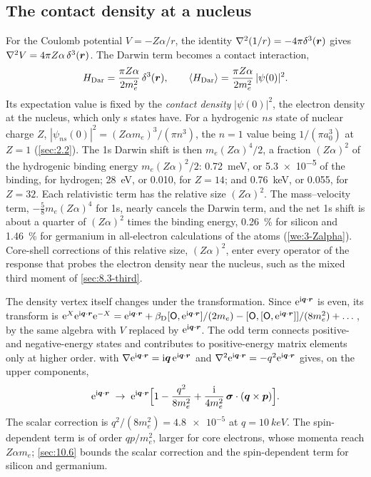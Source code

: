 \subsection{The contact density at a nucleus}

For the Coulomb potential $V = -Z\alpha/r$, the identity $\nabla^2(1/r) = -4\pi\delta^3(\bm{r})$ gives $\nabla^2V = 4\pi Z\alpha\,\delta^3(\bm{r})$. The Darwin term becomes a contact interaction,
\begin{equation}
  H_{\mathrm{Dar}} = \frac{\pi Z\alpha}{2m_e^2}\,\delta^3(\bm{r}), \qquad
  \langle H_{\mathrm{Dar}}\rangle = \frac{\pi Z\alpha}{2m_e^2}\,|\psi(0)|^2 .
  \label{eq:C.15-darwin}
\end{equation}
Its expectation value is fixed by the \emph{contact density} $|\psi(0)|^2$, the electron density at the nucleus, which only s states have. For a hydrogenic $ns$ state of nuclear charge $Z$, $|\psi_{ns}(0)|^2 = (Z\alpha m_e)^3/(\pi n^3)$, the $n = 1$ value being $1/(\pi a_0^3)$ at $Z = 1$ (\cref{sec:2.2}). The 1s Darwin shift is then $m_e(Z\alpha)^4/2$, a fraction $(Z\alpha)^2$ of the hydrogenic binding energy $m_e(Z\alpha)^2/2$: \SI{0.72}{meV}, or \num{5.3e-5} of the binding, for hydrogen; \SI{28}{eV}, or 0.010, for $Z = 14$; and \SI{0.76}{keV}, or 0.055, for $Z = 32$. Each relativistic term has the relative size $(Z\alpha)^2$. The mass--velocity term, $-\tfrac58 m_e(Z\alpha)^4$ for 1s, nearly cancels the Darwin term, and the net 1s shift is about a quarter of $(Z\alpha)^2$ times the binding energy, \SI{0.26}{\percent} for silicon and \SI{1.46}{\percent} for germanium in all-electron calculations of the atoms (\cref{we:3-Zalpha}). Core-shell corrections of this relative size, $(Z\alpha)^2$, enter every operator of the response that probes the electron density near the nucleus, such as the mixed third moment of \cref{sec:8.3-third}.

The density vertex itself changes under the transformation. Since $\mathrm{e}^{\mathrm{i}\bm{q}\cdot\bm{r}}$ is even, its transform is $\mathrm{e}^{X}\mathrm{e}^{\mathrm{i}\bm{q}\cdot\bm{r}}\mathrm{e}^{-X} = \mathrm{e}^{\mathrm{i}\bm{q}\cdot\bm{r}} + \beta_{\mathrm{D}}[\mathsf{O}, \mathrm{e}^{\mathrm{i}\bm{q}\cdot\bm{r}}]/(2m_e) - [\mathsf{O},[\mathsf{O}, \mathrm{e}^{\mathrm{i}\bm{q}\cdot\bm{r}}]]/(8m_e^2) + \dots$, by the same algebra with $V$ replaced by $\mathrm{e}^{\mathrm{i}\bm{q}\cdot\bm{r}}$. The odd term connects positive- and negative-energy states and contributes to positive-energy matrix elements only at higher order.  with $\nabla\mathrm{e}^{\mathrm{i}\bm{q}\cdot\bm{r}} = \mathrm{i}\bm{q}\,\mathrm{e}^{\mathrm{i}\bm{q}\cdot\bm{r}}$ and $\nabla^2\mathrm{e}^{\mathrm{i}\bm{q}\cdot\bm{r}} = -q^2\mathrm{e}^{\mathrm{i}\bm{q}\cdot\bm{r}}$ gives, on the upper components,
\begin{equation}
  \mathrm{e}^{\mathrm{i}\bm{q}\cdot\bm{r}} \;\to\; \mathrm{e}^{\mathrm{i}\bm{q}\cdot\bm{r}}\Bigl[1 - \frac{q^2}{8m_e^2} + \frac{\mathrm{i}}{4m_e^2}\,\boldsymbol{\sigma}\cdot(\bm{q}\times\bm{p})\Bigr] .
  \label{eq:C.15-vertex}
\end{equation}
The scalar correction is $q^2/(8m_e^2) = \num{4.8e-5}$ at $q = \SI{10}{keV}$. The spin-dependent term is of order $qp/m_e^2$, larger for core electrons, whose momenta reach $Z\alpha m_e$; \cref{sec:10.6} bounds the scalar correction and the spin-dependent term for silicon and germanium.
